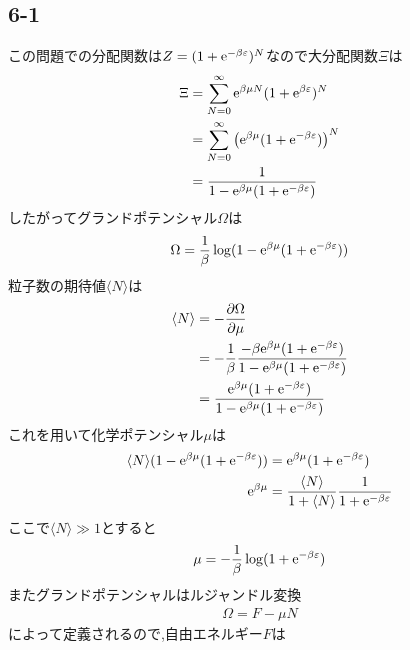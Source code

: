 \subsection*{6-1}
この問題での分配関数は$Z=(1+{\rm e}^{-\beta\varepsilon})^N$なので大分配関数$\Xi$は
\begin{align}
  \begin{split}
    \Xi&=\sum_{N=0}^{\infty}{\rm e}^{\beta\mu N}(1+{\rm e}^{\beta\varepsilon})^N\\
    &=\sum_{N=0}^{\infty}\left({\rm e}^{\beta\mu}(1+{\rm e}^{-\beta\varepsilon})\right)^N\\
    &=\frac{1}{1-{\rm e}^{\beta\mu}(1+{\rm e}^{-\beta\varepsilon})}
  \end{split}
\end{align}
したがってグランドポテンシャル$\Omega$は
\begin{align}
  \Omega=\frac{1}{\beta}\log(1-{\rm e}^{\beta\mu}(1+{\rm e}^{-\beta\varepsilon}))
\end{align}
粒子数の期待値$\langle N\rangle$は
\begin{align}
  \begin{split}
    \langle N\rangle&=-\frac{\partial\Omega}{\partial\mu}\\
    &=-\frac{1}{\beta}\frac{-\beta{\rm e}^{\beta\mu}(1+{\rm e}^{-\beta\varepsilon})}{1-{\rm e}^{\beta\mu}(1+{\rm e}^{-\beta\varepsilon})}\\
    &=\frac{{\rm e}^{\beta\mu}(1+{\rm e}^{-\beta\varepsilon})}{1-{\rm e}^{\beta\mu}(1+{\rm e}^{-\beta\varepsilon})}
  \end{split}
\end{align}
これを用いて化学ポテンシャル$\mu$は
\begin{align}
  \begin{split}
    \langle N\rangle(1-{\rm e}^{\beta\mu}(1+{\rm e}^{-\beta\varepsilon}))&={\rm e}^{\beta\mu}(1+{\rm e}^{-\beta\varepsilon})\\
    {\rm e}^{\beta\mu}&=\frac{\langle N\rangle}{1+\langle N\rangle}\frac{1}{1+{\rm e}^{-\beta\varepsilon}}
  \end{split}
\end{align}
ここで$\langle N\rangle\gg 1$とすると
\begin{align}
  \mu=-\frac{1}{\beta}\log(1+{\rm e}^{-\beta\varepsilon})
\end{align}
またグランドポテンシャルはルジャンドル変換
\begin{align}
  \Omega=F-\mu N
\end{align}
によって定義されるので,自由エネルギー$F$は
